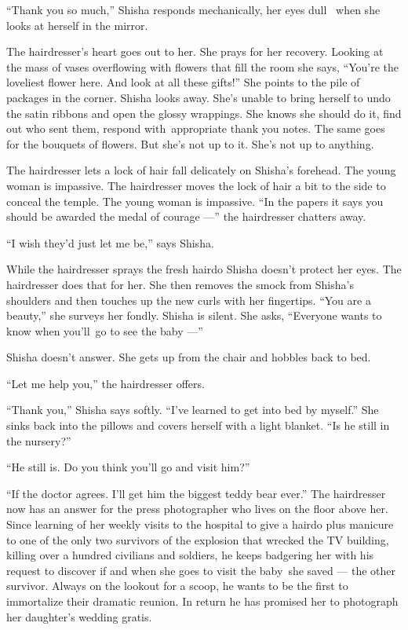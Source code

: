 \documentclass[twoside,11pt]{book}
\begin{document}
``Thank you so much,'' Shisha responds mechanically, her eyes dull ~when she looks at herself
in the mirror.

The hairdresser's heart goes out to her. She prays for her recovery. Looking at the mass of vases overflowing with
flowers that fill the room she says, ``You're the loveliest flower here. And look at all these
gifts!''  She points to the pile of packages in the corner. Shisha looks away. She's unable to bring
herself to undo the satin ribbons and open the glossy wrappings. She knows she should do it, find out who sent them,
respond with~appropriate thank you notes. The same goes for the bouquets of flowers. But she's not up to it.
She's not up to anything.

The hairdresser lets a lock of hair fall delicately on Shisha's forehead. The young woman is impassive. The hairdresser
moves the lock of hair a bit to the side to conceal the temple. The young woman is
impassive.{ }``In the papers it says you should be awarded the
medal of courage ---'' the hairdresser chatters away.

``I wish they'd just let me be,'' says Shisha{.}

While the hairdresser sprays the fresh hairdo Shisha doesn't protect{ }her
eyes. The hairdresser does that for her. She then removes the smock from Shisha's shoulders and then touches up the new
curls with her fingertips. ``You are a beauty,'' she surveys her fondly. Shisha is silent.
She asks, ``Everyone wants to know when you'll~go to see the baby ---''

Shisha doesn't answer. She gets up from the chair and hobbles back to bed.

``Let me help you,'' the hairdresser offers.

``Thank you,'' Shisha says softly. ``I've learned to get into bed by
myself.'' She sinks back into the pillows and covers herself with a light blanket. ``Is he
still in the nursery?''

``He still is. Do you think you'll go and visit him?''

``If the doctor agrees. I'll get him the biggest teddy bear ever.'' The hairdresser now has an
answer for the press photographer who lives on the floor above her. Since learning of her weekly visits to the hospital
to give a hairdo plus manicure to one of the only two survivors of the explosion that wrecked the TV building, killing
over a hundred civilians and soldiers, he keeps badgering her with his request to discover if and when she goes to
visit the baby~she saved --- the other survivor.
Always on the lookout for a scoop, he wants to be the first to
immortalize their dramatic reunion. In return he has promised her to photograph her daughter's wedding gratis.
\end{document}
